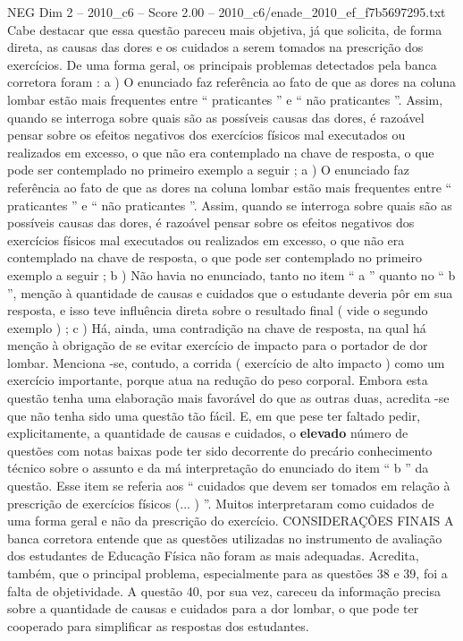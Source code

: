 \begin{textsample}{NEG Dim 2 – 2010\_c6 – Score 2.00 – 2010\_c6/enade\_2010\_ef\_f7b5697295.txt}
Cabe destacar que essa questão pareceu mais objetiva, já que solicita, de forma direta, as causas das dores e os cuidados a serem tomados na prescrição dos exercícios.
De uma forma geral, os principais problemas detectados pela banca corretora foram : a ) O enunciado faz referência ao fato de que as dores na coluna lombar estão mais frequentes entre “ praticantes ” e “ não praticantes ”.
Assim, quando se interroga sobre quais são as possíveis causas das dores, é razoável pensar sobre os efeitos negativos dos exercícios físicos mal executados ou realizados em excesso, o que não era contemplado na chave de resposta, o que pode ser contemplado no primeiro exemplo a seguir ; a ) O enunciado faz referência ao fato de que as dores na coluna lombar estão mais frequentes entre “ praticantes ” e “ não praticantes ”.
Assim, quando se interroga sobre quais são as possíveis causas das dores, é razoável pensar sobre os efeitos negativos dos exercícios físicos mal executados ou realizados em excesso, o que não era contemplado na chave de resposta, o que pode ser contemplado no primeiro exemplo a seguir ; b ) Não havia no enunciado, tanto no item “ a ” quanto no “ b ”, menção à quantidade de causas e cuidados que o estudante deveria pôr em sua resposta, e isso teve influência direta sobre o resultado final ( vide o segundo exemplo ) ; c ) Há, ainda, uma contradição na chave de resposta, na qual há menção à obrigação de se evitar exercício de impacto para o portador de dor lombar.
Menciona -se, contudo, a corrida ( exercício de alto impacto ) como um exercício importante, porque atua na redução do peso corporal.
Embora esta questão tenha uma elaboração mais favorável do que as outras duas, acredita -se que não tenha sido uma questão tão fácil.
E, em que pese ter faltado pedir, explicitamente, a quantidade de causas e cuidados, o \textbf{elevado} número de questões com notas baixas pode ter sido decorrente do precário conhecimento técnico sobre o assunto e da má interpretação do enunciado do item “ b ” da questão.
Esse item se referia aos “ cuidados que devem ser tomados em relação à prescrição de exercícios físicos (... ) ”.
Muitos interpretaram como cuidados de uma forma geral e não da prescrição do exercício.
CONSIDERAÇÕES FINAIS A banca corretora entende que as questões utilizadas no instrumento de avaliação dos estudantes de Educação Física não foram as mais adequadas.
Acredita, também, que o principal problema, especialmente para as questões 38 e 39, foi a falta de objetividade.
A questão 40, por sua vez, careceu da informação precisa sobre a quantidade de causas e cuidados para a dor lombar, o que pode ter cooperado para simplificar as respostas dos estudantes.

\end{textsample}
